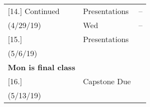 \documentclass[article,oneside]{memoir}
\begin{document}
\begin{center}
\begin{longtable}{p{4.5cm}p{2.5cm}p{6cm}}
[14.] Continued 		& Presentations 			& -- \\ 
(4/29/19)				   &	Wed	   	& -- \\ [1.8\baselineskip]

						
[15.] 	      		& 		Presentations	&   \\
(5/6/19)				      	& 			 &  \\ 
\textbf{Mon is final class}		&			&  \\ [1.8\baselineskip]

[16.] 			 	      		&  Capstone Due				&   \\
(5/13/19)				      	&			      	&  \\  [1.8\baselineskip]



\end{longtable}
\end{center}





\end{document}
